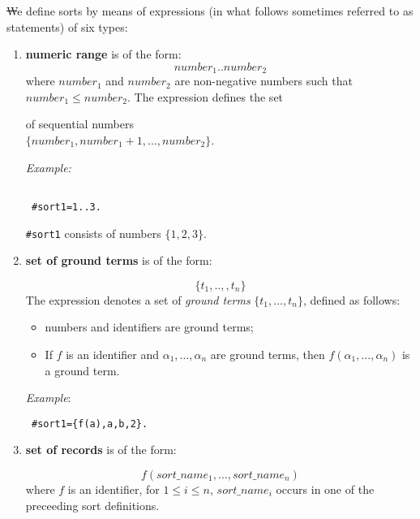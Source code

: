 \documentclass[12pt, letterpaper]{article}
\begin{document}
\st We define sorts by means of expressions (in what follows sometimes referred to as statements) of six types:
\begin{enumerate}


\item\label{numrange}
\textbf{numeric range} is of the form:
\begin{equation*}
number_1..number_2
\end{equation*}
where $number_1$ and $number_2$ are non-negative numbers such that $number_1 \le number_2$. The expression defines the set 

of sequential numbers \\$\{number_1, number_1+1, \dots, number_2\}$.



\textit{Example:}



\begin{verbatim}

 #sort1=1..3.

\end{verbatim}

\texttt{\#sort1} consists of numbers $\{1,2,3\}$.



\item\label{groundset} \textbf{set of ground terms} is of the form:

\begin{equation*}
\{t_1,..,,t_n\}
\end{equation*}
The expression denotes a set of \textit{ground terms} $\{t_1,...,t_n\}$, defined as follows:
\begin{itemize}
 \item numbers and identifiers are ground terms;
 \item If $f$ is an identifier and $\alpha_1, \dots, \alpha_n$ are ground terms, 
then $f(\alpha_1,\dots, \alpha_n)$ is a ground term.
\end{itemize}

\textit{Example}: 
\begin{verbatim}
 #sort1={f(a),a,b,2}.
\end{verbatim}
\item\label{recordset} \textbf{set of records} is of the form:

\begin{equation*}
f(sort\_name_1,..., sort\_name_n)
\end{equation*}
where $f$ is an identifier, for $ 1\leq i\leq n$, $sort\_name_i$ occurs in one of the preceeding sort definitions.


\end{enumerate}
\end{document}

